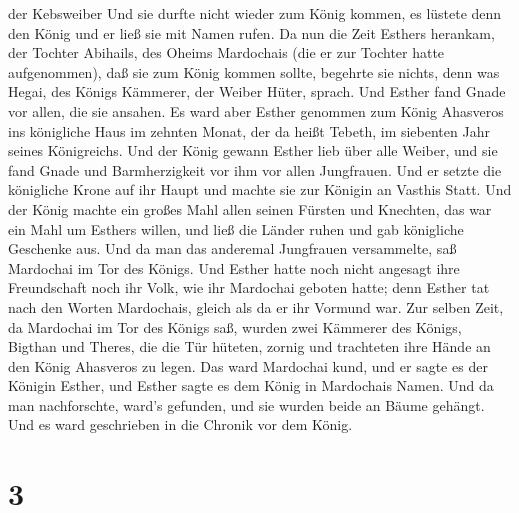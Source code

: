 der Kebsweiber Und sie durfte nicht wieder zum König kommen, es lüstete
denn den König und er ließ sie mit Namen rufen.  Da nun die
Zeit Esthers herankam, der Tochter Abihails, des Oheims Mardochais (die
er zur Tochter hatte aufgenommen), daß sie zum König kommen sollte,
begehrte sie nichts, denn was Hegai, des Königs Kämmerer, der Weiber
Hüter, sprach. Und Esther fand Gnade vor allen, die sie ansahen.
 Es ward aber Esther genommen zum König Ahasveros ins
königliche Haus im zehnten Monat, der da heißt Tebeth, im siebenten Jahr
seines Königreichs.  Und der König gewann Esther lieb über
alle Weiber, und sie fand Gnade und Barmherzigkeit vor ihm vor allen
Jungfrauen. Und er setzte die königliche Krone auf ihr Haupt und machte
sie zur Königin an Vasthis Statt.  Und der König machte ein
großes Mahl allen seinen Fürsten und Knechten, das war ein Mahl um
Esthers willen, und ließ die Länder ruhen und gab königliche Geschenke
aus.  Und da man das anderemal Jungfrauen versammelte, saß
Mardochai im Tor des Königs.  Und Esther hatte noch nicht
angesagt ihre Freundschaft noch ihr Volk, wie ihr Mardochai geboten
hatte; denn Esther tat nach den Worten Mardochais, gleich als da er ihr
Vormund war.  Zur selben Zeit, da Mardochai im Tor des
Königs saß, wurden zwei Kämmerer des Königs, Bigthan und Theres, die die
Tür hüteten, zornig und trachteten ihre Hände an den König Ahasveros zu
legen.  Das ward Mardochai kund, und er sagte es der
Königin Esther, und Esther sagte es dem König in Mardochais Namen.
 Und da man nachforschte, ward's gefunden, und sie wurden
beide an Bäume gehängt. Und es ward geschrieben in die Chronik vor dem
König.

\hypertarget{section-2}{%
\section{3}\label{section-2}}


